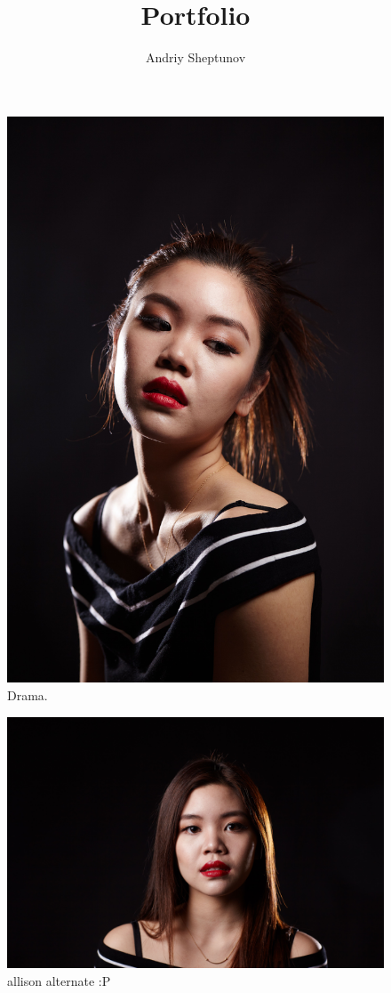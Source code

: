 \documentclass{report}
\title{Portfolio}
\author{Andriy Sheptunov}
\date{}
\begin{document}
\maketitle

\begin{figure}
  \includegraphics[width=\linewidth]{res/port_allison.jpg}
  \caption{Drama.}
\end{figure}

\begin{figure}
  \includegraphics[width=\linewidth]{res/port_allison_alternate.jpg}
  \caption{allison alternate :P}
\end{figure}
\end{document}
